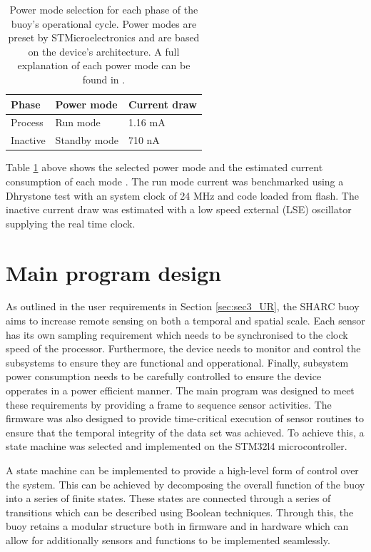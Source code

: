 \begin{table}[H]
	\centering
	\caption{Power mode selection for each phase of the buoy's operational cycle. Power modes are preset by STMicroelectronics and are based on the device's architecture. A full explanation of each power mode can be found in \cite{stm32l4ref}.}
	\begin{tabular}{lll}
		\hline 
	\textbf{Phase} &  \textbf{Power mode} & \textbf{Current draw}\\
		\hline
		\hline
		Process & Run mode & 1.16 mA\\
		\hline
		Inactive & Standby mode & 710 nA\\
		\hline
		\hline
	\end{tabular}
	\label{tab:powmode_cycle}
\end{table}

Table \ref{tab:powmode_cycle} above shows the selected power mode and the estimated current consumption of each mode \cite{stm32l4}. The run mode current was benchmarked using a Dhrystone test with an system clock of 24 MHz and code loaded from flash. The inactive current draw was estimated with a low speed external (LSE) oscillator supplying the real time clock. 

\section{Main program design}
 
As outlined in the user requirements in Section \ref{sec:sec3_UR}, the SHARC buoy aims to increase remote sensing on both a temporal and spatial scale. Each sensor has its own sampling requirement which needs to be synchronised to the clock speed of the processor. Furthermore, the device needs to monitor and control the subsystems to ensure they are functional and opperational. Finally, subsystem power consumption needs to be carefully controlled to ensure the device opperates in a power efficient manner. The main program was designed to meet these requirements by providing a frame to sequence sensor activities. The firmware was also designed to provide time-critical execution of sensor routines to ensure that the temporal integrity of the data set was achieved. To achieve this, a state machine was selected and implemented on the STM32l4 microcontroller. \par

A state machine can be implemented to provide a high-level form of control over the system. This can be achieved by decomposing the overall function of the buoy into a series of finite states. These states are connected through a series of transitions which can be described using Boolean techniques. Through this, the buoy retains a modular structure both in firmware and in hardware which can allow for additionally sensors and functions to be implemented seamlessly.\par 

